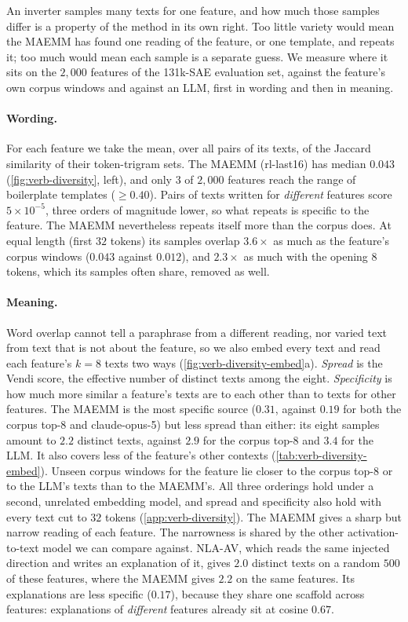 
An inverter samples many texts for one feature, and how much those samples differ is a property of
the method in its own right. Too little variety would mean the MAEMM has found one reading of the
feature, or one template, and repeats it; too much would mean each sample is a separate guess. We
measure where it sits on the $2{,}000$ features of the 131k-SAE evaluation set, against the
feature's own corpus windows and against an LLM, first in wording and then in meaning.

\paragraph{Wording.} For each feature we take the mean, over all pairs of its texts, of the Jaccard
similarity of their token-trigram sets. The MAEMM (rl-last16) has median $0.043$
(\cref{fig:verb-diversity}, left), and only $3$ of $2{,}000$ features reach the range of
boilerplate templates ($\geq 0.40$). Pairs of texts written for \emph{different} features score
$5 \times 10^{-5}$, three orders of magnitude lower, so what repeats is specific to the feature. The
MAEMM nevertheless repeats itself more than the corpus does. At equal length (first $32$ tokens)
its samples overlap $3.6\times$ as much as the feature's corpus windows ($0.043$ against $0.012$), and
$2.3\times$ as much with the opening $8$ tokens, which its samples often share, removed as well.

\paragraph{Meaning.} Word overlap cannot tell a paraphrase from a different reading, nor varied text
from text that is not about the feature, so we also embed every text and read each feature's $k=8$
texts two ways (\cref{fig:verb-diversity-embed}a). \emph{Spread} is the Vendi score, the effective
number of distinct texts among the eight. \emph{Specificity} is how much more similar a feature's
texts are to each other than to texts for other features. The MAEMM is the most specific source
($0.31$, against $0.19$ for both the corpus top-8 and claude-opus-5) but less spread than either:
its eight samples amount to $2.2$ distinct texts, against $2.9$ for the corpus top-8 and $3.4$ for
the LLM. It
also covers less of the feature's other contexts (\cref{tab:verb-diversity-embed}). Unseen corpus
windows for the feature lie closer to the corpus top-8 or to the LLM's texts than to the MAEMM's.
All three orderings hold under a second, unrelated embedding model, and spread and specificity
also hold with every text cut to $32$ tokens (\cref{app:verb-diversity}). The MAEMM gives a sharp
but narrow reading of each feature. The narrowness is shared by the other activation-to-text model
we can compare against. NLA-AV, which reads the same injected direction and writes an explanation of
it, gives $2.0$ distinct texts on a random $500$ of these features, where the MAEMM gives $2.2$ on
the same features. Its explanations are less specific ($0.17$), because they share one scaffold
across features: explanations of \emph{different} features already sit at cosine $0.67$.

